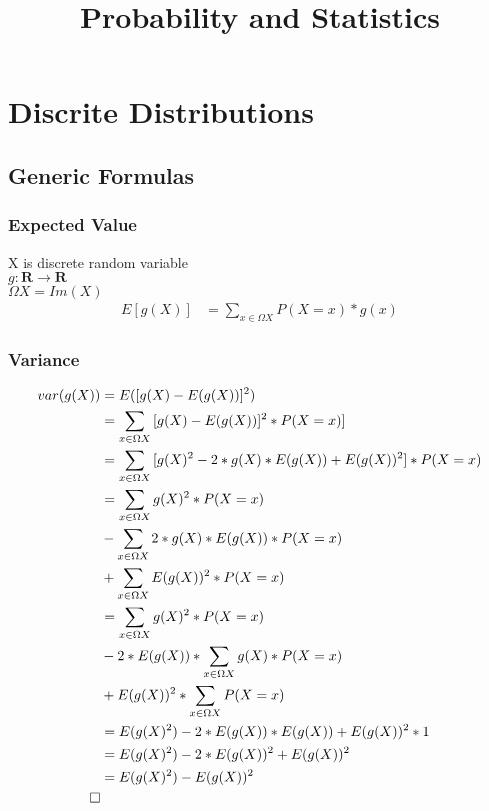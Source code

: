 \documentclass[]{article}
\title{Probability and Statistics}
\author{}
\begin{document}
	
\maketitle
	
\setcounter{tocdepth}{1}
\tableofcontents
\newpage

\chapter {Discrite Distributions}

\section{Generic Formulas}

\subsection{Expected Value}
X is discrete random variable\\
$g : \mathbf{R} \rightarrow \mathbf{R}$\\
$\Omega X = Im(X)$\\

\begin{align}
	E[g(X)] &= \sum_{x \in \Omega X} {P(X=x)*g(x)}
\end{align}

\subsection{Variance}

\begin{align}
	var(g(X)) &= E([g(X) - E(g(X))]^2)\\
	&= \sum_{x\in \Omega X} {[g(X) - E(g(X))]^2*P(X=x)]}\\
	&= \sum_{x\in \Omega X} {[g(X)^2 - 2*g(X)*E(g(X)) + E(g(X))^2]*P(X=x)}\\
	&= \sum_{x\in \Omega X} {g(X)^2*P(X=x)} \\&- \sum_{x\in \Omega X} {2*g(X)*E(g(X))*P(X=x)} \\&+ \sum_{x \in \Omega X} {E(g(X))^2*P(X=x)}\\
	&= \sum_{x\in \Omega X} {g(X)^2*P(X=x)} \\&- 2*E(g(X))*\sum_{x\in \Omega X} {g(X)*P(X=x)} \\&+ E(g(X))^2*\sum_{x \in \Omega X} {P(X=x)}\\
	&= E(g(X)^2) - 2*E(g(X))*E(g(X)) + E(g(X))^2*1\\
	&= E(g(X)^2) - 2*E(g(X))^2 + E(g(X))^2\\
	&= E(g(X)^2) - E(g(X))^2\\
	\qed
\end{align}
\end{document}
